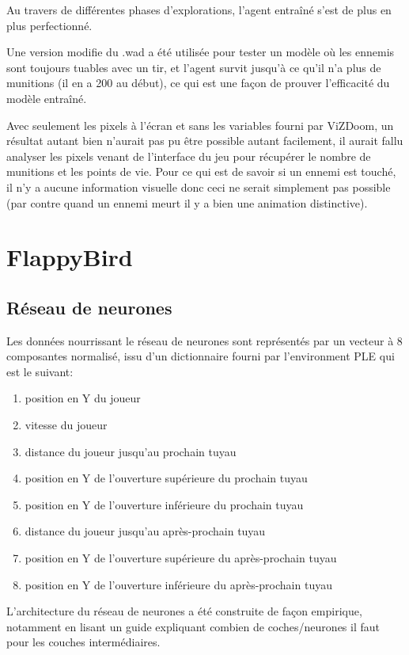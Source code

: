 \documentclass[a4paper,10pt,openany,oneside]{report}
\begin{document}
Au travers de différentes phases d'explorations, l'agent entraîné s'est de plus en plus perfectionné.

Une version modifie du .wad a été utilisée pour tester un modèle où les ennemis sont toujours tuables avec un tir, et l'agent survit jusqu'à ce qu'il n'a plus de munitions (il en a 200 au début), ce qui est une façon de prouver l'efficacité du modèle entraîné.

Avec seulement les pixels à l'écran et sans les variables fourni par ViZDoom, un résultat autant bien n'aurait pas pu être possible autant facilement, il aurait fallu analyser les pixels venant de l'interface du jeu pour récupérer le nombre de munitions et les points de vie. Pour ce qui est de savoir si un ennemi est touché, il n'y a aucune information visuelle donc ceci ne serait simplement pas possible (par contre quand un ennemi meurt il y a bien une animation distinctive).
\section{FlappyBird}
\subsection{Réseau de neurones}
Les données nourrissant le réseau de neurones sont représentés par un vecteur à 8 composantes normalisé, issu d'un dictionnaire fourni par l'environment PLE qui est le suivant:
\begin{enumerate}
\item position en Y du joueur
\item vitesse du joueur
\item distance du joueur jusqu'au prochain tuyau
\item position en Y de l'ouverture supérieure du prochain tuyau
\item position en Y de l'ouverture inférieure du prochain tuyau
\item distance du joueur jusqu'au après-prochain tuyau
\item position en Y de l'ouverture supérieure du après-prochain tuyau
\item position en Y de l'ouverture inférieure du après-prochain tuyau
\end{enumerate}

L'architecture du réseau de neurones a été construite de façon empirique, notamment en lisant un guide expliquant combien de coches/neurones il faut pour les couches intermédiaires\cite[]{layerGuide}.
\end{document}
